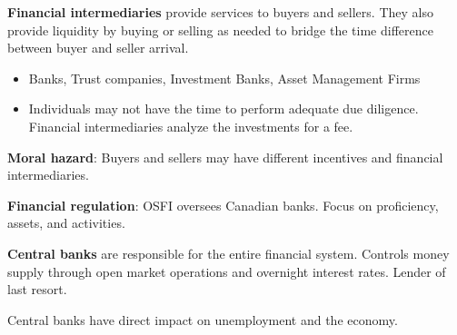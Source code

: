 \documentclass[english, 12pt]{article}
\begin{document}
\begin{defn}
\textbf{Financial intermediaries} provide services to buyers and sellers. They also provide liquidity by buying or selling as needed to bridge the time difference between buyer and seller arrival.
\begin{itemize}
\item Banks, Trust companies, Investment Banks, Asset Management Firms
\item Individuals may not have the time to perform adequate due diligence. Financial intermediaries analyze the investments for a fee.
\end{itemize}
\end{defn}

\begin{defn}
\textbf{Moral hazard}: Buyers and sellers may have different incentives and financial intermediaries.
\end{defn}

\begin{defn}
\textbf{Financial regulation}: OSFI oversees Canadian banks. Focus on proficiency, assets, and activities.
\end{defn}

\begin{defn}
\textbf{Central banks} are responsible for the entire financial system. Controls money supply through open market operations and overnight interest rates. Lender of last resort.
\end{defn}
\begin{qte}
Central banks have direct impact on unemployment and the economy.
\end{qte}
\end{document}
